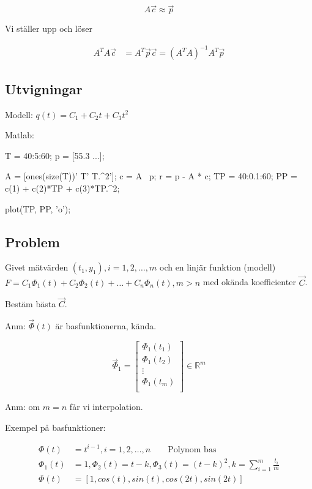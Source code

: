 \documentclass[a4paper,10pt,swedish]{memoir}
\numberwithin{equation}{subsection}
\begin{document}
\begin{equation}
A\vec{c}\approx \vec{p}
\end{equation}

Vi ställer upp och löser

\begin{align}
A^TA\vec{c}&=A^T\vec{p}
\vec{c}=(A^TA)^{-1}A^T\vec{p}
\end{align}

\subsection{Utvigningar}

Modell: $q(t) = C_1 + C_2 t + C_3 t^2$

Matlab:

\begin{matlabcode}
T = 40:5:60;
p = [55.3 ...];

A = [ones(size(T))' T' T.^2'];
c = A \ p;
r = p - A * c;
TP = 40:0.1:60;
PP = c(1) + c(2)*TP + c(3)*TP.^2;

plot(TP, PP, 'o');
\end{matlabcode}

\subsection{Problem}

Givet mätvärden $(t_1, y_1), i=1,2,\ldots,m$ och en linjär funktion (modell)
$F=C_1 \Phi_1(t) + C_2\Phi_2(t) + \ldots + C_n\Phi_n(t), m > n$ med okända koefficienter $\vec{C}$.

Bestäm bästa $\vec{C}$.

Anm: $\vec{\Phi}(t)$ är basfunktionerna, kända.

\begin{equation}
\vec{\Phi}_1 = \left[\begin{array}{c}
\Phi_1(t_1) \\
\Phi_1(t_2) \\
\vdots \\
\Phi_1(t_m) \\
\end{array}\right] \in \mathbb{R}^m
\end{equation}

Anm: om $m=n$ får vi interpolation.

Exempel på basfunktioner:

\begin{align}
\Phi(t) &= t^{i-1}, i = 1,2,\ldots,n \qquad \text{Polynom bas} \\
\Phi_1(t) &= 1, \Phi_2(t) = t-k, \Phi_3(t) = (t-k)^2, k = \sum_{i=1}^{m}\frac{t_i}{m} \\
\Phi(t) &= \left[1, cos(t), sin(t), cos(2t), sin(2t)\right]
\end{align}
\end{document}
